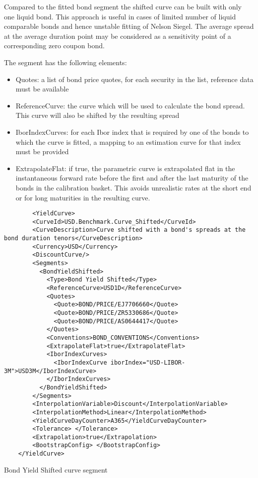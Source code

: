 Compared to the fitted bond segment the shifted curve can be built with only one liquid bond. This approach is useful in
cases of limited number of liquid comparable bonds and hence unstable fitting of Nelson Siegel. The average spread
at the average duration point may be considered as a sensitivity point of a corresponding zero coupon bond.

The segment has the following elements:

\begin{itemize}
  \item Quotes: a list of bond price quotes, for each security in the list, reference data must be available
  \item ReferenceCurve: the curve which will be used to calculate the bond spread. This curve will also be shifted by the resulting spread
  \item IborIndexCurves: for each Ibor index that is required by one of the bonds to which the curve is fitted, a mapping
    to an estimation curve for that index must be provided
  \item ExtrapolateFlat: if true, the parametric curve is extrapolated flat in the instantaneous forward rate before the
    first and after the last maturity of the bonds in the calibration basket. This avoids unrealistic rates at the short
    end or for long maturities in the resulting curve.
  \end{itemize}

  \begin{listing}[H]
    \begin{verbatim}
        <YieldCurve>
        <CurveId>USD.Benchmark.Curve_Shifted</CurveId>
        <CurveDescription>Curve shifted with a bond's spreads at the bond duration tenors</CurveDescription>
        <Currency>USD</Currency>
        <DiscountCurve/>
        <Segments>
          <BondYieldShifted>
            <Type>Bond Yield Shifted</Type>
            <ReferenceCurve>USD1D</ReferenceCurve>
            <Quotes>
              <Quote>BOND/PRICE/EJ7706660</Quote>
              <Quote>BOND/PRICE/ZR5330686</Quote>
              <Quote>BOND/PRICE/AS0644417</Quote>
            </Quotes>
            <Conventions>BOND_CONVENTIONS</Conventions>
            <ExtrapolateFlat>true</ExtrapolateFlat>
            <IborIndexCurves>
              <IborIndexCurve iborIndex="USD-LIBOR-3M">USD3M</IborIndexCurve>
            </IborIndexCurves>
          </BondYieldShifted>
        </Segments>
        <InterpolationVariable>Discount</InterpolationVariable>
        <InterpolationMethod>Linear</InterpolationMethod>
        <YieldCurveDayCounter>A365</YieldCurveDayCounter>
        <Tolerance> </Tolerance>
        <Extrapolation>true</Extrapolation>
        <BootstrapConfig> </BootstrapConfig>
    </YieldCurve>
    \end{verbatim}
    \caption{Bond Yield Shifted curve segment}
    \label{lst:bond_yield_shifted}
    \end{listing}



